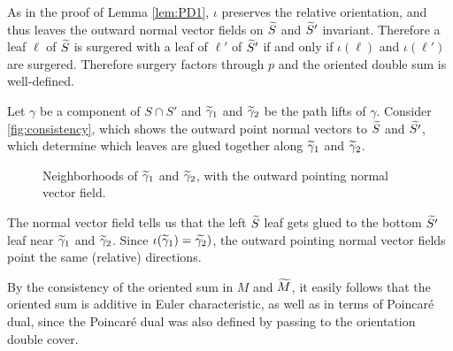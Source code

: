As in the proof of Lemma \ref{lem:PD1}, $\iota$ preserves the relative orientation, and thus leaves the outward
normal vector fields on $\widetilde{S}$ and $\widetilde{S}'$ invariant. Therefore a leaf $\ell$ of $\widetilde{S}$ is surgered with a leaf of $\ell'$ of $\widetilde{S}'$ if and only if $\iota(\ell)$ and $\iota(\ell')$ are surgered.  Therefore surgery factors through $p$ and the oriented double sum is well-defined.  %

 Let $\gamma$ be a component of $S\cap S'$ and $\widetilde{\gamma}_1$ and $\widetilde{\gamma}_2$ be the path lifts of $\gamma$.  Consider
\autoref{fig:consistency}, which shows the outward point normal vectors to $\widetilde{S}$ and $\widetilde{S'}$,
which determine which leaves are glued together along $\widetilde{\gamma}_1$ and $\widetilde{\gamma}_2$.
\begin{figure}
  \centering
  \caption{Neighborhoods of $\widetilde{\gamma}_1$ and $\widetilde{\gamma}_2$, with the outward pointing normal vector field.}
  \label{fig:consistency}
\end{figure}

The normal vector field tells us that the left $\widetilde{S}$ leaf gets glued to the bottom $\widetilde{S'}$
leaf near $\widetilde{\gamma}_1$ and $\widetilde{\gamma}_2$. Since $\iota(\widetilde{\gamma}_1)=\widetilde{\gamma_2})$, the outward pointing normal vector fields point the same (relative) directions.  %


 By the consistency of the oriented sum in $M$ and $\widetilde{M}$, it easily follows that the oriented sum
is additive in Euler characteristic, as well as in terms of Poincar\'e dual, since the Poincar\'e
dual was also defined by passing to the orientation double cover.
